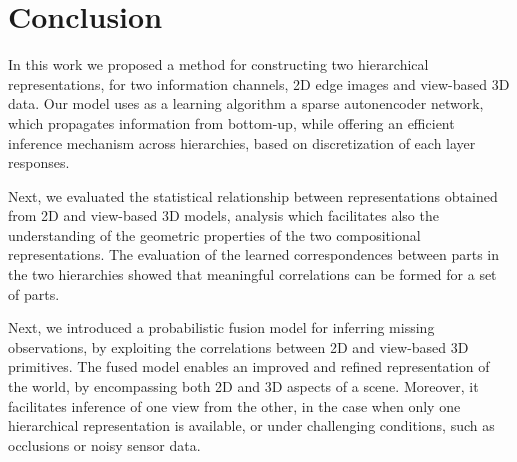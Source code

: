 \documentclass[runningheads]{llncs}
\begin{document}
\section{Conclusion}
\label{sec:conclusions}
 
In this work we proposed a method for constructing two hierarchical representations, for two information channels, 2D edge images and view-based 3D data. Our model uses as a learning algorithm a sparse autonencoder network, which propagates information from bottom-up, while offering an efficient inference mechanism across hierarchies, based on discretization of each layer responses. 

Next, we evaluated the statistical relationship between representations obtained from 2D and view-based 3D models, analysis which facilitates also the understanding of the geometric properties of the two compositional representations. The evaluation of the learned correspondences between parts in the two hierarchies showed that meaningful correlations can be formed for a set of parts. 

Next, we introduced a probabilistic fusion model for inferring missing observations, by exploiting the correlations between 2D and view-based 3D primitives. The fused model enables an improved and refined representation of the world, by encompassing both 2D and 3D aspects of a scene. Moreover, it facilitates inference of one view from the other, in the case when only one hierarchical representation is available, or under challenging conditions, such as occlusions or noisy sensor data. 



\end{document}
